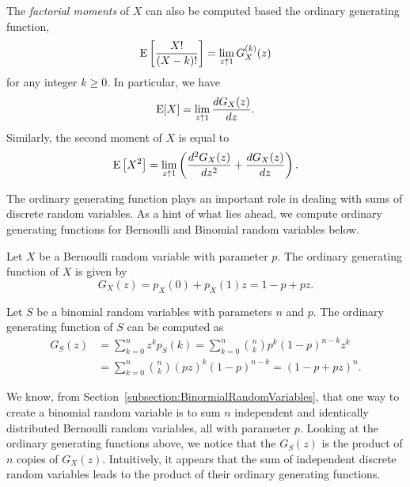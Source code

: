 The \emph{factorial moments} of $X$ can also be computed based the ordinary generating function,
\begin{equation*}
\mathrm{E} \left[ \frac{X!}{(X-k)!} \right]
= \lim_{z \uparrow 1} G_X^{(k)} (z)
\end{equation*}
for any integer $k \geq 0$.
In particular, we have
\begin{equation*}
\mathrm{E} [X] = \lim_{z \uparrow 1} \frac{d G_X(z)}{dz} .
\end{equation*}
Similarly, the second moment of $X$ is equal to
\begin{equation*}
\mathrm{E} \left[ X^2 \right]
= \lim_{z \uparrow 1} \left( \frac{d^2 G_X(z)}{dz^2} + \frac{d G_X(z)}{dz} \right) .
\end{equation*}

The ordinary generating function plays an important role in dealing with sums of discrete random variables.
As a hint of what lies ahead, we compute ordinary generating functions for Bernoulli and Binomial random variables below.

\begin{example}
Let $X$ be a Bernoulli random variable with parameter $p$.
The ordinary generating function of $X$ is given by
\begin{equation*}
G_X(z) = p_X(0) + p_X(1) z
= 1 - p + pz .
\end{equation*}
\end{example}

\begin{example}
Let $S$ be a binomial random variables with parameters $n$ and $p$.
The ordinary generating function of $S$ can be computed as
\begin{equation*}
\begin{split}
G_S(z) &= \sum_{k=0}^{n} z^k p_S (k)
= \sum_{k=0}^{n} \binom{n}{k} p^k (1 - p)^{n-k} z^k \\
&= \sum_{k=0}^{n} \binom{n}{k} (pz)^k (1 - p)^{n-k}
= (1 - p + pz)^n .
\end{split}
\end{equation*}
\end{example}

We know, from Section~\ref{subsection:BinormialRandomVariables}, that one way to create a binomial random variable is to sum $n$ independent and identically distributed Bernoulli random variables, all with parameter $p$.
Looking at the ordinary generating functions above, we notice that the $G_S(z)$ is the product of $n$ copies of $G_X(z)$.
Intuitively, it appears that the sum of independent discrete random variables leads to the product of their ordinary generating functions.

